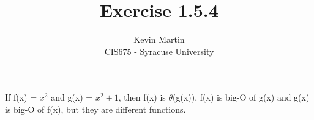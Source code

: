 \documentclass{article}
\author{Kevin Martin\\ CIS675 - Syracuse University}
\title{Exercise 1.5.4}
\begin{document}
\maketitle

If f(x) = \(x^2\) and g(x) = \(x^2 + 1\), then f(x) is \(\theta\)(g(x)), f(x) is big-O of g(x) and 
g(x) is big-O of f(x), but they are different functions.
\end{document}
